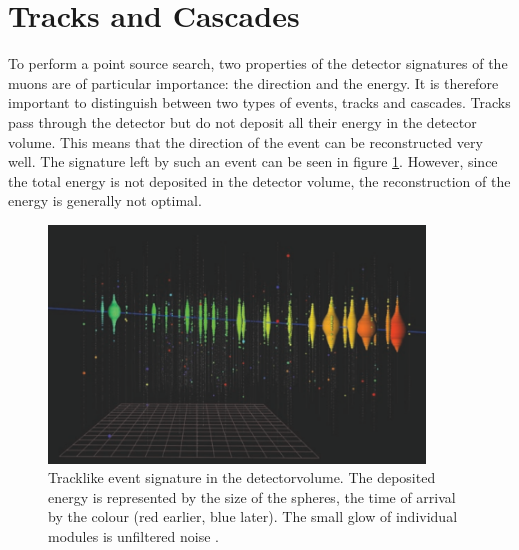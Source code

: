 \section{Tracks and Cascades}

To perform a point source search, two properties of the detector signatures of the muons are of particular importance: the direction and the energy.
It is therefore important to distinguish between two types of events, tracks and cascades.
Tracks pass through the detector but do not deposit all their energy in the detector volume.
This means that the direction of the event can be reconstructed very well.
The signature left by such an event can be seen in figure \ref{fig:track}.
However, since the total energy is not deposited in the detector volume, the reconstruction of the energy is generally not optimal.
\begin{figure}
    \centering
    \includegraphics[width=10cm]{Plots/01_7_icecube/track.png}
    \caption{Tracklike event signature in the detectorvolume. The deposited energy is represented by the size of the spheres, the time of arrival by the colour (red earlier, blue later). The small glow of individual modules is unfiltered noise \cite{spiering}.}
    \label{fig:track}
\end{figure}

